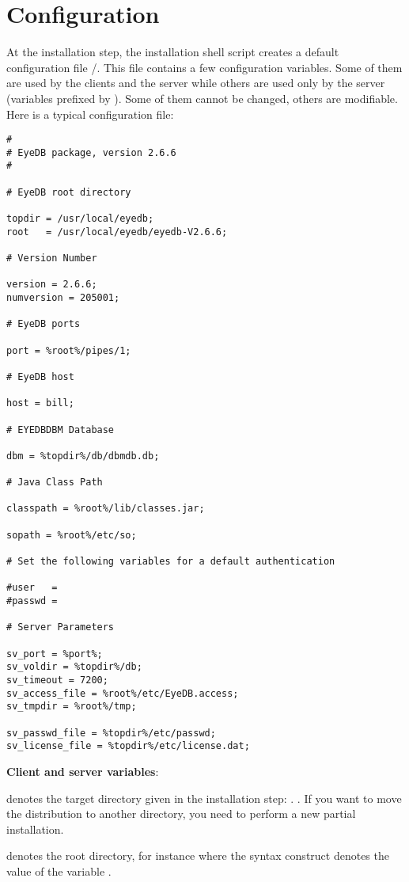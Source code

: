 \section{Configuration}
At the installation step, the installation shell script creates
a default configuration file \tdir/.
This file contains a few configuration variables. Some of them
are used by the \eyedb clients and the server while others
are used only by the server (variables prefixed by ).
Some of them cannot be changed, others are modifiable.
Here is a typical configuration file:
\verbsize
\begin{verbatim}
#
# EyeDB package, version 2.6.6
#

# EyeDB root directory

topdir = /usr/local/eyedb;
root   = /usr/local/eyedb/eyedb-V2.6.6;

# Version Number

version = 2.6.6;
numversion = 205001;

# EyeDB ports

port = %

# EyeDB host

host = bill;

# EYEDBDBM Database

dbm = %

# Java Class Path

classpath = %

sopath = %

# Set the following variables for a default authentication

#user   = 
#passwd = 

# Server Parameters

sv_port = %
sv_voldir = %
sv_timeout = 7200;
sv_access_file = %
sv_tmpdir = %

sv_passwd_file = %
sv_license_file = %
\end{verbatim}
\normalsize
{\bf Client and server variables}:
\bi
\item {} denotes the target directory
given in the installation step: \tdir. \constvar.
If you want to move the \eyedb distribution to another
directory, you need to perform a new partial installation.
\item {} denotes the \eyedb root directory,
for instance  where the syntax
construct  denotes the value of the variable .
